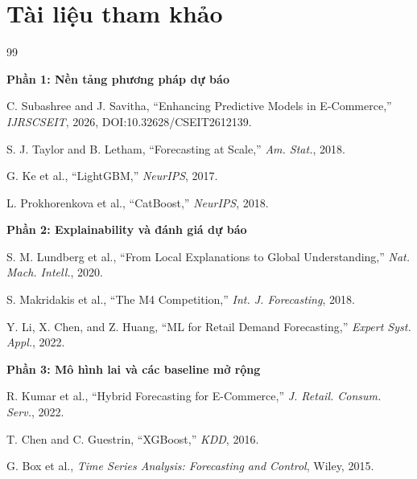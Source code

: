 \documentclass[10pt,twocolumn]{article}
\begin{document}
\section*{Tài liệu tham khảo}
\vspace{-4pt}
{\scriptsize
\begin{thebibliography}{99}

\item[] \textbf{Phần 1: Nền tảng phương pháp dự báo}

C. Subashree and J. Savitha, ``Enhancing Predictive Models in E-Commerce,'' \textit{IJRSCSEIT}, 2026, DOI:10.32628/CSEIT2612139.

S. J. Taylor and B. Letham, ``Forecasting at Scale,'' \textit{Am. Stat.}, 2018.

G. Ke et al., ``LightGBM,'' \textit{NeurIPS}, 2017.

L. Prokhorenkova et al., ``CatBoost,'' \textit{NeurIPS}, 2018.

\item[] \textbf{Phần 2: Explainability và đánh giá dự báo}

S. M. Lundberg et al., ``From Local Explanations to Global Understanding,'' \textit{Nat. Mach. Intell.}, 2020.

S. Makridakis et al., ``The M4 Competition,'' \textit{Int. J. Forecasting}, 2018.

Y. Li, X. Chen, and Z. Huang, ``ML for Retail Demand Forecasting,'' \textit{Expert Syst. Appl.}, 2022.

\item[] \textbf{Phần 3: Mô hình lai và các baseline mở rộng}

R. Kumar et al., ``Hybrid Forecasting for E-Commerce,'' \textit{J. Retail. Consum. Serv.}, 2022.

T. Chen and C. Guestrin, ``XGBoost,'' \textit{KDD}, 2016.

G. Box et al., \textit{Time Series Analysis: Forecasting and Control}, Wiley, 2015.

\end{thebibliography}
}
\end{document}
